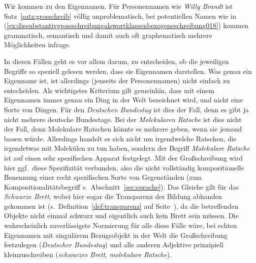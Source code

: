 Wir kommen zu den Eigennamen.
Für Personennamen wie \textit{Willy Brandt} ist Satz~\ref{satz:grosschreib} völlig unproblematisch, bei potentiellen Namen wie in (\ref{ex:diesubstantivgrossschreibungalswortklassenbezogeneschreibung018}) kommen grammatisch, semantisch und damit auch oft graphematisch mehrere Möglichkeiten infrage.


\begin{exe}
  \ex\label{ex:diesubstantivgrossschreibungalswortklassenbezogeneschreibung018}
  \begin{xlist}
  \end{xlist}
\end{exe}


In diesen Fällen geht es vor allem darum, zu entscheiden, ob die jeweiligen Begriffe so speziell gelesen werden, dass sie Eigennamen darstellen.
Was genau ein Eigenname ist, ist allerdings (jenseits der Personennamen) nicht einfach zu entscheiden.
Als wichtigstes Kriterium gilt gemeinhin, dass mit einem Eigennamen immer genau ein Ding in der Welt bezeichnet wird, und nicht eine Sorte von Dingen.
Für den \textit{Deutschen Bundestag} ist dies der Fall, denn es gibt ja nicht mehrere deutsche Bundestage.
Bei der \textit{Molekularen Ratsche} ist dies nicht der Fall, denn Molekulare Ratschen könnte es mehrere geben, wenn sie jemand bauen würde.
Allerdings handelt es sich nicht um irgendwelche Ratschen, die irgendetwas mit Molekülen zu tun haben, sondern der Begriff \textit{Molekulare Ratsche} ist auf einen sehr spezifischen Apparat festgelegt.
Mit der Großschreibung wird hier ggf.\ diese Spezifizität verbunden, also die nicht vollständig kompositionelle Benennung einer recht spezifischen Sorte von Gegenständen (zum Kompositionalitätsbegriff s.\ Abschnitt~\ref{sec:sprache}).
Das Gleiche gilt für das \textit{Schwarze Brett}, wobei hier sogar die Transparenz der Bildung abhanden gekommen ist (s.\ Definition~\ref{def:transparenz} auf Seite~\pageref{def:transparenz}), da die betreffenden Objekte nicht einmal schwarz und eigentlich auch kein Brett sein müssen.
Die wahrscheinlich zuverlässigste Normierung für alle diese Fälle wäre, bei echten Eigennamen mit singulärem Bezugsobjekt in der Welt die Großschreibung festzulegen (\textit{Deutscher Bundestag}) und alle anderen Adjektive prinzipiell kleinzuschreiben (\textit{schwarzes Brett}, \textit{molekulare Ratsche}).

